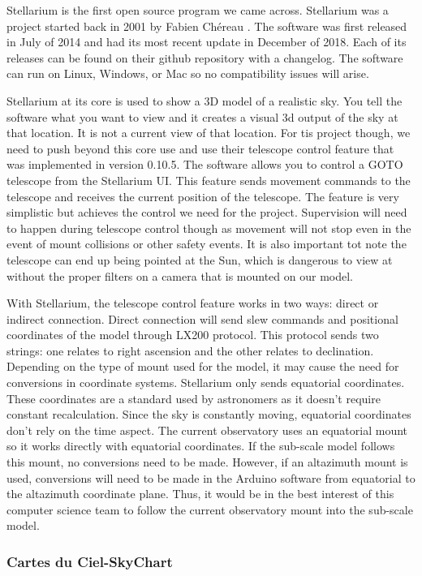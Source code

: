 \documentclass[12pt]{report}
\begin{document}
Stellarium is the first open source program we came across. Stellarium was a project started back in 2001 by Fabien Chéreau \cite{stell}. The software was first released in July of 2014 and had its most recent update in December of 2018. Each of its releases can be found on their github repository with a changelog. The software can run on Linux, Windows, or Mac so no compatibility issues will arise.

Stellarium at its core is used to show a 3D model of a realistic sky. You tell the software what you want to view and it creates a visual 3d output of the sky at that location. It is not a current view of that location. For tis project though, we need to push beyond this core use and use their telescope control feature that was implemented in version 0.10.5. The software allows you to control a GOTO telescope from the Stellarium UI. This feature sends movement commands to the telescope and receives the current position of the telescope. The feature is very simplistic but achieves the control we need for the project. Supervision will need to happen during telescope control though as movement will not stop even in the event of mount collisions or other safety events. It is also important tot note the telescope can end up being pointed at the Sun, which is dangerous to view at without the proper filters on a camera that is mounted on our model.

With Stellarium, the telescope control feature works in two ways: direct or indirect connection. Direct connection will send slew commands and positional coordinates of the model through LX200 protocol. This protocol sends two strings: one relates to right ascension and the other relates to declination. Depending on the type of mount used for the model, it may cause the need for conversions in coordinate systems. Stellarium only sends equatorial coordinates. These coordinates are a standard used by astronomers as it doesn't require constant recalculation. Since the sky is constantly moving, equatorial coordinates don't rely on the time aspect. The current observatory uses an equatorial mount so it works directly with equatorial coordinates. If the sub-scale model follows this mount, no conversions need to be made. However, if an altazimuth mount is used, conversions will need to be made in the Arduino software from equatorial to the altazimuth coordinate plane. Thus, it would be in the best interest of this computer science team to follow the current observatory mount into the sub-scale model.

\subsubsection*{Cartes du Ciel-SkyChart}
\end{document}
